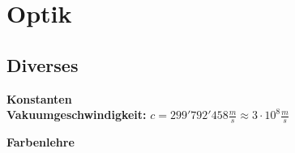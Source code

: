 \section{Optik}

\subsection{Diverses}
    \begin{minipage}[t]{6cm}
  	\textbf{Konstanten} \\
     	\textbf{Vakuumgeschwindigkeit:} \newline 
    		$c=299'792'458 \frac{m}{s} \approx 3 \cdot 10^8 \frac{m}{s}$
  \end{minipage}
  \begin{minipage}[t]{6cm}
  	\textbf{Farbenlehre }
  		   
  \end{minipage}
 

